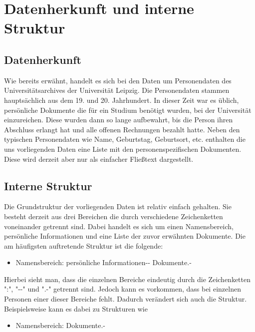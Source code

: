 \section{Datenherkunft und interne Struktur}
 \label{sec:Datenherkunft und interne Struktur}
 
\subsection{Datenherkunft}
 \label{subsec:Datenherkunft}
 
Wie bereits erwähnt, handelt es sich bei den Daten um Personendaten des Universitätsarchives der Universität Leipzig. Die Personendaten stammen hauptsächlich aus dem 19. und 20. Jahrhundert. In dieser Zeit war es üblich, persönliche Dokumente die für ein Studium benötigt wurden, bei der Universität einzureichen. Diese wurden dann so lange aufbewahrt, bis die Person ihren Abschluss erlangt hat und alle offenen Rechnungen bezahlt hatte. Neben den typischen Personendaten wie Name, Geburtstag, Geburtsort, etc. enthalten die uns vorliegenden Daten eine Liste mit den personenspezifischen Dokumenten. Diese wird derzeit aber nur als einfacher Fließtext dargestellt.

\subsection{Interne Struktur} 
 \label{subsec:Interne Struktur}
 
Die Grundstruktur der vorliegenden Daten ist relativ einfach gehalten. Sie besteht derzeit aus drei Bereichen die durch verschiedene Zeichenketten voneinander getrennt sind. Dabei handelt es sich um einen Namensbereich, persönliche Informationen und eine Liste der zuvor erwähnten Dokumente. Die am häufigsten auftretende Struktur ist die folgende: 

\begin{itemize}
 \item Namensbereich: persönliche Informationen-{}- Dokumente.-
\end{itemize}

\noindent
Hierbei sieht man, dass die einzelnen Bereiche eindeutig durch die Zeichenketten "{}:"{}, "{}-{}-"{} und "{}.-"{} getrennt sind. Jedoch kann es vorkommen, dass bei einzelnen Personen einer dieser Bereiche fehlt. Dadurch verändert sich auch die Struktur. Beispielsweise kann es dabei zu Strukturen wie

\begin{itemize}
 \item Namensbereich: Dokumente.-
\end{itemize}

